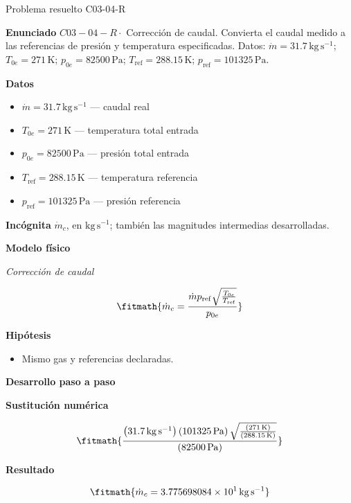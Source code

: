 \documentclass[10pt,openany]{book}
\begin{document}
\begin{studiumworked}{Problema resuelto C03-04-R}


\noindent\textbf{Enunciado}
\(C03-04-R \cdot\) Corrección de caudal. Convierta el caudal medido a las referencias de presión y temperatura especificadas. Datos: \(\dot m=31.7\, \mathrm{kg}\,\mathrm{s}^{-1}\); \(T_{0e}=271\, \mathrm{K}\); \(p_{0e}=82500\, \mathrm{Pa}\); \(T_{\mathrm{ref}}=288.15\, \mathrm{K}\); \(p_{\mathrm{ref}}=101325\, \mathrm{Pa}\).

\noindent\textbf{Datos}
\begin{itemize}
\item $\dot m = 31.7\,\mathrm{kg}\,\mathrm{s}^{-1}$ — caudal real
\item $T_{0e} = 271\,\mathrm{K}$ — temperatura total entrada
\item $p_{0e} = 82500\,\mathrm{Pa}$ — presión total entrada
\item $T_{\mathrm{ref}} = 288.15\,\mathrm{K}$ — temperatura referencia
\item $p_{\mathrm{ref}} = 101325\,\mathrm{Pa}$ — presión referencia
\end{itemize}

\noindent\textbf{Incógnita}
$\dot{m}_c$, en $\mathrm{kg\,s^{-1}}$; también las magnitudes intermedias desarrolladas.

\noindent\textbf{Modelo físico}

\noindent\textit{Corrección de caudal}

\[
\fitmath{\dot{m}_c=\frac{\dot m p_{\mathrm{ref}} \sqrt{\frac{T_{0e}}{T_{\mathrm{ref}}}}}{p_{0e}}}
\]

\noindent\textbf{Hipótesis}
\begin{itemize}
\item Mismo gas y referencias declaradas.
\end{itemize}

\noindent\textbf{Desarrollo paso a paso}



\noindent\textbf{Sustitución numérica}

\[
\fitmath{\frac{\left(31.7\,\mathrm{kg}\,\mathrm{s}^{-1}\right) \left(101325\,\mathrm{Pa}\right) \sqrt{\frac{\left(271\,\mathrm{K}\right)}{\left(288.15\,\mathrm{K}\right)}}}{\left(82500\,\mathrm{Pa}\right)}}
\]

\noindent\textbf{Resultado}

\[
\fitmath{\dot{m}_c=3.775698084\times10^{1}\,\mathrm{kg}\,\mathrm{s}^{-1}}
\]


\end{studiumworked}
\end{document}
